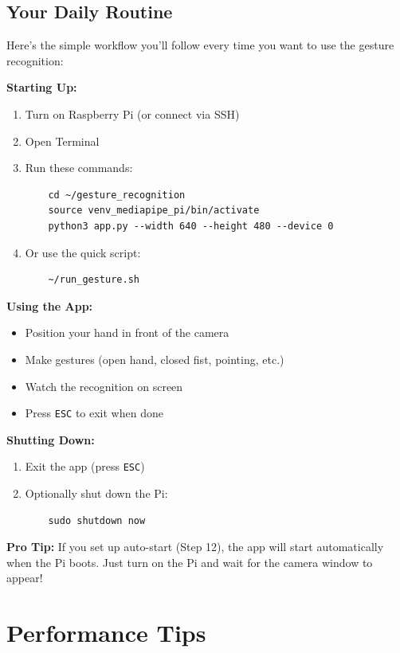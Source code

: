 \documentclass[12pt,a4paper]{article}
\begin{document}
\subsection{Your Daily Routine}

Here's the simple workflow you'll follow every time you want to use the gesture recognition:

\textbf{Starting Up:}
\begin{enumerate}
    \item Turn on Raspberry Pi (or connect via SSH)
    \item Open Terminal
    \item Run these commands:
    \begin{lstlisting}
    cd ~/gesture_recognition
    source venv_mediapipe_pi/bin/activate
    python3 app.py --width 640 --height 480 --device 0
    \end{lstlisting}
    \item Or use the quick script:
    \begin{lstlisting}
    ~/run_gesture.sh
    \end{lstlisting}
\end{enumerate}

\textbf{Using the App:}
\begin{itemize}
    \item Position your hand in front of the camera
    \item Make gestures (open hand, closed fist, pointing, etc.)
    \item Watch the recognition on screen
    \item Press \texttt{ESC} to exit when done
\end{itemize}

\textbf{Shutting Down:}
\begin{enumerate}
    \item Exit the app (press \texttt{ESC})
    \item Optionally shut down the Pi:
    \begin{lstlisting}
    sudo shutdown now
    \end{lstlisting}
\end{enumerate}

\begin{tipbox}
\textbf{Pro Tip:} If you set up auto-start (Step 12), the app will start automatically when the Pi boots. Just turn on the Pi and wait for the camera window to appear!
\end{tipbox}

\section{Performance Tips}
\end{document}
